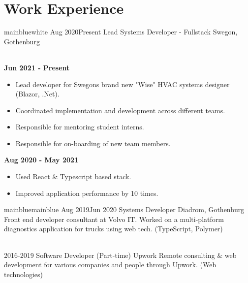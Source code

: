\documentclass[a4paper]{twentysecondcv} %
\begin{document}
\section{Work Experience}
\begin{twenty} %
    \twentyitemtime
    {mainblue}{white}
    {Aug 2020}{Present}
    {Lead Systems Developer - Fullstack}
    {Swegon, Gothenburg}
    {
    \\
    \textbf{Jun 2021 - Present}
    \begin{itemize}
        \setlength\itemsep{.5em}
        \item Lead developer for Swegons brand new "Wise" HVAC systems designer (Blazor, .Net).
        \item Coordinated implementation and development across different teams.
        \item Responsible for mentoring student interns.
        \item Responsible for on-boarding of new team members.
    \end{itemize}
    
    \vspace{1em}
    
    \textbf{Aug 2020 - May 2021}
    \begin{itemize}
        \setlength\itemsep{.5em}
        \item Used React \& Typescript based stack.
        \item Improved application performance by 10 times.
    \end{itemize}
    }
    
    \vspace{.5em}
    
    \twentyitemtime
    {mainblue}{mainblue}
    {Aug 2019}{Jun 2020}
    {Systems Developer}
    {Diadrom, Gothenburg}
    {Front end developer consultant at Volvo IT. Worked on a multi-platform diagnostics application for trucks using web tech. (TypeScript, Polymer)}
    
    \\
    
    \twentyitem
    {2016-2019}
    {Software Developer (Part-time)}
    {Upwork}
    {Remote consulting \& web development for various companies and people through Upwork. (Web technologies)}
    
\end{twenty}
\end{document}
